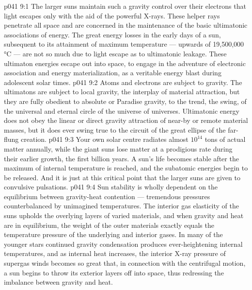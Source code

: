 \vs p041 9:1 The larger suns maintain such a gravity control over their electrons that light escapes only with the aid of the powerful X\hyp{}rays. These helper rays penetrate all space and are concerned in the maintenance of the basic ultimatonic associations of energy. The great energy losses in the early days of a sun, subsequent to its attainment of maximum temperature --- upwards of 19,500,000\,°C --- are not so much due to light escape as to ultimatonic leakage. These ultimaton energies escape out into space, to engage in the adventure of electronic association and energy materialization, as a veritable energy blast during adolescent solar times.
\vs p041 9:2 \pc Atoms and electrons are subject to gravity. The ultimatons are  subject to local gravity, the interplay of material attraction, but they are fully obedient to absolute or Paradise gravity, to the trend, the swing, of the universal and eternal circle of the universe of universes. Ultimatonic energy does not obey the linear or direct gravity attraction of near\hyp{}by or remote material masses, but it does ever swing true to the circuit of the great ellipse of the far\hyp{}flung creation.
\vs p041 9:3 \pc Your own solar centre radiates almost $10^{14}$ tons of actual matter annually, while the giant suns lose matter at a prodigious rate during their earlier growth, the first billion years. A sun’s life becomes stable after the maximum of internal temperature is reached, and the subatomic energies begin to be released. And it is just at this critical point that the larger suns are given to convulsive pulsations.
\vs p041 9:4 Sun stability is wholly dependent on the equilibrium between gravity\hyp{}heat contention --- tremendous pressures counterbalanced by unimagined temperatures. The interior gas elasticity of the suns upholds the overlying layers of varied materials, and when gravity and heat are in equilibrium, the weight of the outer materials exactly equals the temperature pressure of the underlying and interior gases. In many of the younger stars continued gravity condensation produces ever\hyp{}heightening internal temperatures, and as internal heat increases, the interior X\hyp{}ray pressure of supergas winds becomes so great that, in connection with the centrifugal motion, a sun begins to throw its exterior layers off into space, thus redressing the imbalance between gravity and heat.
